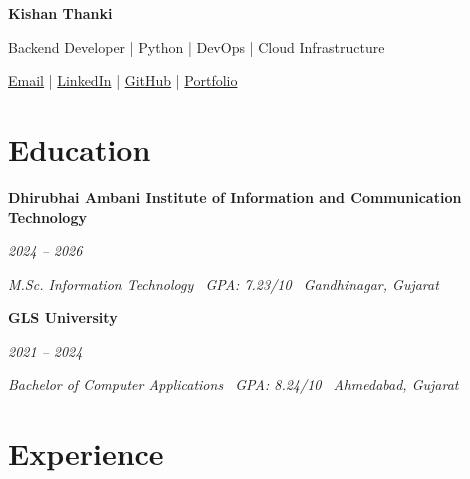 \documentclass[10pt,a4paper]{article}
\newcommand{\datedentry}[2]{%
    \noindent
    \begin{minipage}[t]{0.72\linewidth}
        \raggedright
        \textbf{#1}
    \end{minipage}%
    \hfill
    \begin{minipage}[t]{0.25\linewidth}
        \raggedleft
        \textit{\color{textgray}#2}
    \end{minipage}%
    \par
}
\begin{document}
\begin{center}
    {\fontsize{24}{28}\selectfont
    \bfseries\color{accent} Kishan Thanki}
    \par\vspace{1.5pt}

    {\fontsize{10.5}{13}\selectfont
    \color{textgray}
    Backend Developer | Python | DevOps | Cloud Infrastructure}
    \par\vspace{2.5pt}

    {\fontsize{10}{12}\selectfont
    \href{mailto:kishanthankiat10@gmail.com}{Email}
    \quad|\quad
    \href{https://www.linkedin.com/in/kishanthanki8}{LinkedIn}
    \quad|\quad
    \href{https://github.com/kishan-thanki}{GitHub}
    \quad|\quad
    \href{https://kishan-thanki.github.io/kishanthanki/}{Portfolio}
    }
\end{center}

\section*{Education}

\datedentry
    {Dhirubhai Ambani Institute of Information and Communication Technology}
    {2024 -- 2026}

\vspace{1.5pt}

{\fontsize{10}{12}\selectfont
\itshape\color{textgray}
M.Sc. Information Technology
\textperiodcentered\ GPA: 7.23/10
\textperiodcentered\ Gandhinagar, Gujarat
}

\vspace{4pt}

\datedentry
    {GLS University}
    {2021 -- 2024}

\vspace{1.5pt}

{\fontsize{10}{12}\selectfont
\itshape\color{textgray}
Bachelor of Computer Applications
\textperiodcentered\ GPA: 8.24/10
\textperiodcentered\ Ahmedabad, Gujarat
}

\section*{Experience}
\end{document}
